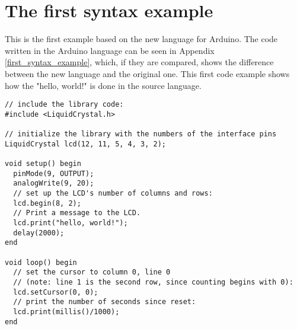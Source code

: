 \section{The first syntax example}
This is the first example based on the new language for Arduino. The code written in the Arduino language can be seen in Appendix \ref{first_syntax_example}, which, if they are compared, shows the difference between the new language and the original one. This first code example shows how the "hello, world!" is done in the source language. 
\begin{lstlisting}[caption=Hello World code example based on the source language, label=lst:syntax1]
// include the library code:
#include <LiquidCrystal.h>

// initialize the library with the numbers of the interface pins
LiquidCrystal lcd(12, 11, 5, 4, 3, 2);

void setup() begin
  pinMode(9, OUTPUT);
  analogWrite(9, 20);
  // set up the LCD's number of columns and rows: 
  lcd.begin(8, 2);
  // Print a message to the LCD.
  lcd.print("hello, world!");
  delay(2000);
end

void loop() begin
  // set the cursor to column 0, line 0
  // (note: line 1 is the second row, since counting begins with 0):
  lcd.setCursor(0, 0);
  // print the number of seconds since reset:
  lcd.print(millis()/1000);
end
\end{lstlisting}
